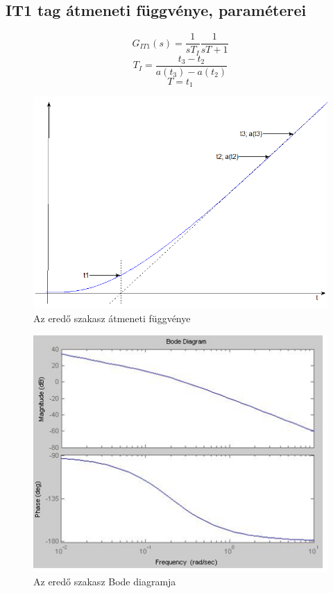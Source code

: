 \documentclass[11pt,a4paper]{article}
\begin{document}
\subsection{IT1 tag átmeneti függvénye, paraméterei}
$$G_{IT1}\left(s\right) = \frac{1}{sT_I}\frac{1}{sT+1}$$
$$T_I = \frac{t_3 - t_2}{a\left(t_3\right)- a\left(t_2\right)}$$
$$T = t_1$$
\begin{figure}[hbtp]
    	 \centering
		\includegraphics[scale=0.5]{39_it1_atmeneti.png}
		\caption{Az eredő szakasz átmeneti függvénye}
\end{figure}
\begin{figure}[hbtp]
    	 \centering
		\includegraphics[scale=1.0]{40_it1_bode.png}
		\caption{Az eredő szakasz Bode diagramja}
\end{figure}
\\\\
\end{document}
